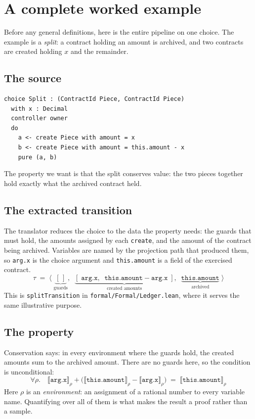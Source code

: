 \documentclass[11pt,a4paper]{article}
\newcommand{\seme}[2]{\llbracket #1 \rrbracket_{#2}}
\newcommand{\code}[1]{\texttt{#1}}
\theoremstyle{definition}
\theoremstyle{plain}
\theoremstyle{remark}
\begin{document}
\section{A complete worked example}
\label{sec:worked}

Before any general definitions, here is the entire pipeline on one choice. The
example is a \emph{split}: a contract holding an amount is archived, and two
contracts are created holding $x$ and the remainder.

\subsection{The source}

\begin{lstlisting}
choice Split : (ContractId Piece, ContractId Piece)
  with x : Decimal
  controller owner
  do
    a <- create Piece with amount = x
    b <- create Piece with amount = this.amount - x
    pure (a, b)
\end{lstlisting}

\noindent
The property we want is that the split conserves value: the two pieces together
hold exactly what the archived contract held.

\subsection{The extracted transition}

The translator reduces the choice to the data the property needs: the guards
that must hold, the amounts assigned by each \code{create}, and the amount of
the contract being archived. Variables are named by the projection path that
produced them, so \code{arg.x} is the choice argument and \code{this.amount} is
a field of the exercised contract.
\[
  \tau \;=\; \bigl\langle\;
    \underbrace{[\,]}_{\text{guards}},\;\;
    \underbrace{[\;\code{arg.x},\;\; \code{this.amount} - \code{arg.x}\;]}_{\text{created amounts}},\;\;
    \underbrace{\code{this.amount}}_{\text{archived}}
  \;\bigr\rangle
\]
This is \code{splitTransition} in \code{formal/Formal/Ledger.lean}, where it
serves the same illustrative purpose.

\subsection{The property}

Conservation says: in every environment where the guards hold, the created
amounts sum to the archived amount. There are no guards here, so the condition
is unconditional:
\[
  \forall \rho.\quad
  \seme{\code{arg.x}}{\rho} + \bigl(\seme{\code{this.amount}}{\rho} - \seme{\code{arg.x}}{\rho}\bigr)
  \;=\; \seme{\code{this.amount}}{\rho}
\]
Here $\rho$ is an \emph{environment}: an assignment of a rational number to
every variable name. Quantifying over all of them is what makes the result a
proof rather than a sample.
\end{document}
